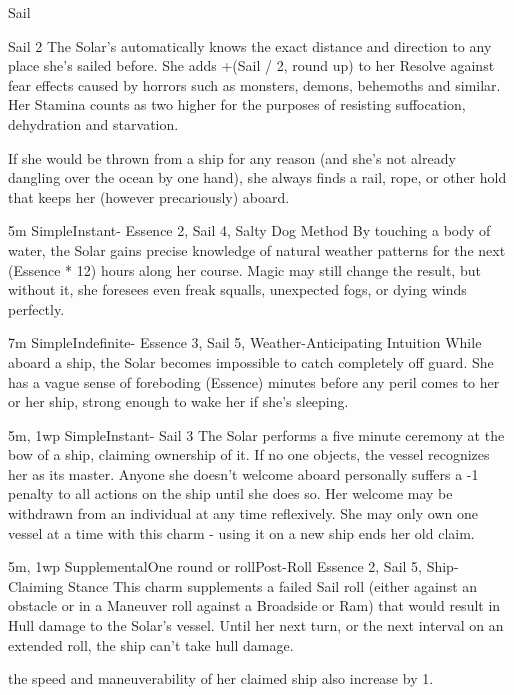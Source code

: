 \begin{Ability}{Sail}

  {Sail 2}
  The Solar's automatically knows the exact distance and direction to any place she's sailed before. She adds +(Sail / 2, round up) to her Resolve against fear effects caused by horrors such as monsters, demons, behemoths and similar. Her Stamina counts as two higher for the purposes of resisting suffocation, dehydration and starvation.

  If she would be thrown from a ship for any reason (and she's not already dangling over the ocean by one hand), she always finds a rail, rope, or other hold that keeps her (however precariously) aboard.

  {5m}
  {Simple}{Instant}{-}
  {Essence 2, Sail 4, Salty Dog Method}
  By touching a body of water, the Solar gains precise knowledge of natural weather patterns for the next (Essence * 12) hours along her course. Magic may still change the result, but without it, she foresees even freak squalls, unexpected fogs, or dying winds perfectly.

  {7m}
  {Simple}{Indefinite}{-}
  {Essence 3, Sail 5, Weather-Anticipating Intuition}
  While aboard a ship, the Solar becomes impossible to catch completely off guard. She has a vague sense of foreboding (Essence) minutes before any peril comes to her or her ship, strong enough to wake her if she's sleeping.

  {5m, 1wp}
  {Simple}{Instant}{-}
  {Sail 3}
  The Solar performs a five minute ceremony at the bow of a ship, claiming ownership of it. If no one objects, the vessel recognizes her as its master. Anyone she doesn't welcome aboard personally suffers a -1 penalty to all actions on the ship until she does so. Her welcome may be withdrawn from an individual at any time reflexively. She may only own one vessel at a time with this charm - using it on a new ship ends her old claim.

  {5m, 1wp}
  {Supplemental}{One round or roll}{Post-Roll}
  {Essence 2, Sail 5, Ship-Claiming Stance}
  This charm supplements a failed Sail roll (either against an obstacle or in a Maneuver roll against a Broadside or Ram) that would result in Hull damage to the Solar's vessel. Until her next turn, or the next interval on an extended roll, the ship can't take hull damage.

  the speed and maneuverability of her claimed ship also increase by 1.


\end{Ability}
